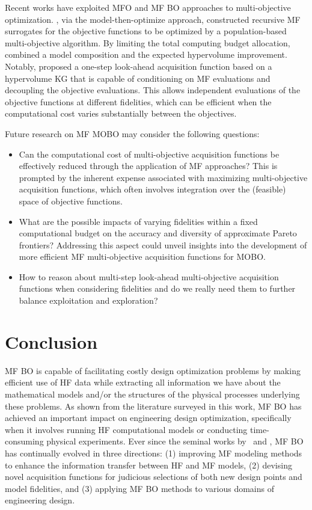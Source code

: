 \documentclass[journal ]{new-aiaa}
\begin{document}
Recent works have exploited MFO and MF BO approaches to multi-objective optimization.
\citet{Singh2017}, via the model-then-optimize approach, constructed recursive MF surrogates for the objective functions to be optimized by a population-based multi-objective algorithm. 
By limiting the total computing budget allocation, \citet{Khatamsaz2021aiaa} combined a model composition and the expected hypervolume improvement.
Notably, \citet{Daulton2023} proposed a one-step look-ahead
acquisition function based on a hypervolume KG that is capable of conditioning on MF evaluations and decoupling the objective evaluations.
This allows independent evaluations of the objective functions at different fidelities, which can be efficient when the computational cost varies substantially between the objectives.

Future research on MF MOBO may consider the following questions:
\begin{itemize}
	\item Can the computational cost of multi-objective acquisition functions be effectively reduced through the application of MF approaches? This is prompted by the inherent expense associated with maximizing multi-objective acquisition functions, which often involves integration over the (feasible) space of objective functions.
	
	\item What are the possible impacts of varying fidelities within a fixed computational budget on the accuracy and diversity of approximate Pareto frontiers? Addressing this aspect could unveil insights into the development of more efficient MF multi-objective acquisition functions for MOBO.
	
	\item How to reason about multi-step look-ahead multi-objective acquisition functions when considering fidelities and do we really need them to further balance exploitation and exploration? 
\end{itemize}

\section{Conclusion}\label{Sec7}
MF BO is capable of facilitating costly design optimization problems by making efficient use of HF data while extracting all information we have about the mathematical models and/or the structures of the physical processes underlying these problems. 
As shown from the literature surveyed in this work, MF BO has achieved an important impact on engineering design optimization, specifically when it involves running HF computational models or conducting time-consuming physical experiments.
Ever since the seminal works by~\citet{Huang2006smo} and \citet{Forrester2007}, MF BO has continually evolved in three directions: (1) improving MF modeling methods to enhance the information transfer between HF and MF models, (2) devising novel acquisition functions for judicious selections of both new design points and model fidelities, and (3) applying MF BO methods to various domains of engineering design.
 
\end{document}
